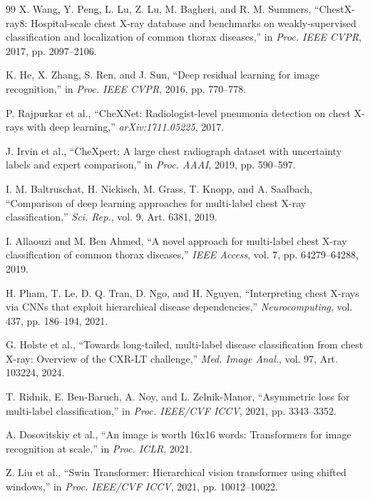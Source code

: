 \documentclass[conference]{IEEEtran}
\begin{document}
\begin{thebibliography}{99}
X. Wang, Y. Peng, L. Lu, Z. Lu, M. Bagheri, and R. M. Summers, ``ChestX-ray8: Hospital-scale chest X-ray database and benchmarks on weakly-supervised classification and localization of common thorax diseases,'' in \textit{Proc. IEEE CVPR}, 2017, pp. 2097--2106.

K. He, X. Zhang, S. Ren, and J. Sun, ``Deep residual learning for image recognition,'' in \textit{Proc. IEEE CVPR}, 2016, pp. 770--778.

P. Rajpurkar et al., ``CheXNet: Radiologist-level pneumonia detection on chest X-rays with deep learning,'' \textit{arXiv:1711.05225}, 2017.

J. Irvin et al., ``CheXpert: A large chest radiograph dataset with uncertainty labels and expert comparison,'' in \textit{Proc. AAAI}, 2019, pp. 590--597.

I. M. Baltruschat, H. Nickisch, M. Grass, T. Knopp, and A. Saalbach, ``Comparison of deep learning approaches for multi-label chest X-ray classification,'' \textit{Sci. Rep.}, vol. 9, Art. 6381, 2019.

I. Allaouzi and M. Ben Ahmed, ``A novel approach for multi-label chest X-ray classification of common thorax diseases,'' \textit{IEEE Access}, vol. 7, pp. 64279--64288, 2019.

H. Pham, T. Le, D. Q. Tran, D. Ngo, and H. Nguyen, ``Interpreting chest X-rays via CNNs that exploit hierarchical disease dependencies,'' \textit{Neurocomputing}, vol. 437, pp. 186--194, 2021.

G. Holste et al., ``Towards long-tailed, multi-label disease classification from chest X-ray: Overview of the CXR-LT challenge,'' \textit{Med. Image Anal.}, vol. 97, Art. 103224, 2024.

T. Ridnik, E. Ben-Baruch, A. Noy, and L. Zelnik-Manor, ``Asymmetric loss for multi-label classification,'' in \textit{Proc. IEEE/CVF ICCV}, 2021, pp. 3343--3352.

A. Dosovitskiy et al., ``An image is worth 16x16 words: Transformers for image recognition at scale,'' in \textit{Proc. ICLR}, 2021.

Z. Liu et al., ``Swin Transformer: Hierarchical vision transformer using shifted windows,'' in \textit{Proc. IEEE/CVF ICCV}, 2021, pp. 10012--10022.


\end{thebibliography}
\end{document}
